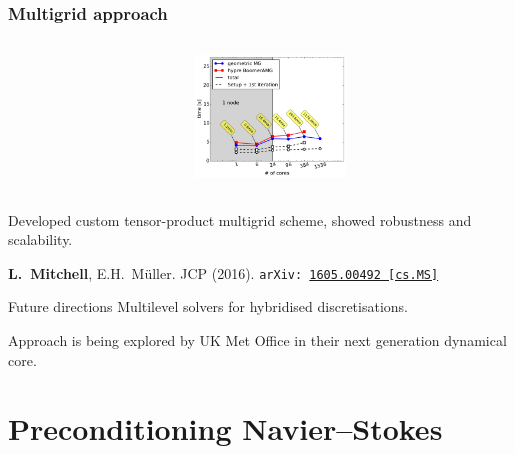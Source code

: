 \documentclass[presentation,aspectratio=43, 10pt]{beamer}
\newcommand{\arxivlink}[2]{{\texttt{arXiv:\,\href{https://arxiv.org/abs/#1}{#1\,[#2]}}}}
\begin{document}
\begin{frame}
  \frametitle{Multigrid approach}
  \begin{columns}
    \begin{column}{0.5\textwidth}
    \end{column}
    \begin{column}{0.4\textwidth}
      \includegraphics[width=4cm]{nwp-multigrid-scaling}
    \end{column}
  \end{columns}
    Developed custom tensor-product multigrid scheme, showed robustness
    and scalability.

    {\raggedleft\scriptsize\hfill \textbf{L.~Mitchell}, E.H.~M\"uller. JCP (2016). \arxivlink{1605.00492}{cs.MS}\nocite{Mitchell:2016}}
    \begin{block}{Future directions}
      Multilevel solvers for hybridised discretisations.

      Approach is being explored by UK Met Office in their next generation dynamical
      core.
    \end{block}
\end{frame}

\section{Preconditioning Navier--Stokes}
\end{document}

